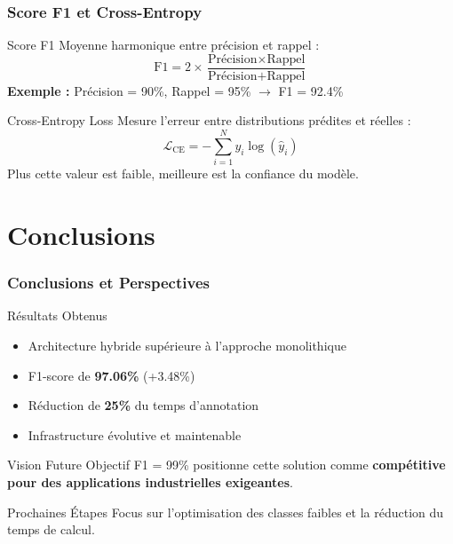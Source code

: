 \documentclass[
	11pt,
	aspectratio=169,
]{beamer}
\begin{document}

\begin{frame}
	\frametitle{Score F1 et Cross-Entropy}
	
	\begin{block}{Score F1}
		Moyenne harmonique entre précision et rappel :
		\begin{equation*}
			\text{F1} = 2 \times \frac{\text{Précision} \times \text{Rappel}}{\text{Précision} + \text{Rappel}}
		\end{equation*}
		\textbf{Exemple :} Précision = 90\%, Rappel = 95\% $\rightarrow$ F1 = 92.4\%
	\end{block}
	
	\begin{block}{Cross-Entropy Loss}
		Mesure l'erreur entre distributions prédites et réelles :
		\begin{equation*}
			\mathcal{L}_{\text{CE}} = -\sum_{i=1}^{N} y_i \log(\hat{y}_i)
		\end{equation*}
		Plus cette valeur est faible, meilleure est la confiance du modèle.
	\end{block}
	\bigskip
\end{frame}


\section{Conclusions}

\begin{frame}
	\frametitle{Conclusions et Perspectives}
	
	\begin{block}{Résultats Obtenus}
		\begin{itemize}
			\item Architecture hybride \alert{supérieure} à l'approche monolithique
			\item F1-score de \textbf{97.06\%} (+3.48\%)
			\item Réduction de \textbf{25\%} du temps d'annotation
			\item Infrastructure évolutive et maintenable
		\end{itemize}
	\end{block}
	
	\bigskip
	
	\begin{exampleblock}{Vision Future}
		Objectif F1 = 99\% positionne cette solution comme
		\textbf{compétitive pour des applications industrielles exigeantes}.
	\end{exampleblock}
	
	\bigskip
	
	\begin{alertblock}{Prochaines Étapes}
		Focus sur l'optimisation des classes faibles et la réduction du temps de calcul.
	\end{alertblock}
\end{frame}
\end{document}
